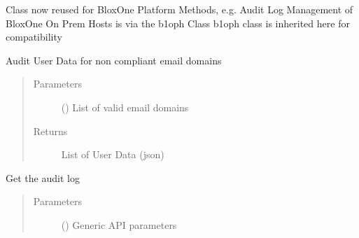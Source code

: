 \documentclass[letterpaper,10pt,english]{sphinxmanual}
\begin{document}
\begin{fulllineitems}
\label{\detokenize{b1platform-class:bloxone.b1platform}}
\sphinxAtStartPar
Class now reused for BloxOne Platform Methods, e.g. Audit Log
Management of BloxOne On Prem Hosts is via the b1oph Class
b1oph class  is inherited here for compatibility

\begin{fulllineitems}
\label{\detokenize{b1platform-class:bloxone.b1platform.audit_users}}
\sphinxAtStartPar
Audit User Data for non compliant email domains
\begin{quote}\begin{description}
\item[{Parameters}] \leavevmode
\sphinxAtStartPar
{} () \textendash{} List of valid email domains

\item[{Returns}] \leavevmode
\sphinxAtStartPar
List of User Data (json)

\end{description}\end{quote}

\end{fulllineitems}


\begin{fulllineitems}
\label{\detokenize{b1platform-class:bloxone.b1platform.auditlog}}
\sphinxAtStartPar
Get the audit log
\begin{quote}\begin{description}
\item[{Parameters}] \leavevmode
\sphinxAtStartPar
{} () \textendash{} Generic API parameters


\end{description}
\end{quote}
\end{fulllineitems}
\end{fulllineitems}
\end{document}
